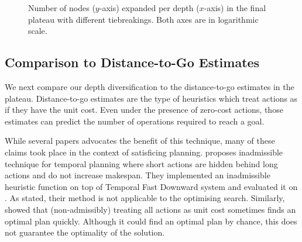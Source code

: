 \begin{figure}[tb]
 \caption{Number of nodes ($y$-axis) expanded per depth ($x$-axis) in
 the final plateau with different tiebreakings. Both axes are in logarithmic scale.
 }
 \label{fig:depth-histogram}
\end{figure}




\subsection{Comparison to Distance-to-Go Estimates}

We next compare our depth diversification to the distance-to-go
estimates in the plateau.  Distance-to-go estimates are the type of
heuristics which treat actions as if they have the unit cost. Even under
the presence of zero-cost actions, those estimates can predict the
number of operations required to reach a goal.

While several papers advocates the benefit of this technique, many of
these claims took place in the context of satisficing planning.
\cite{benton2010g} proposes inadmissible technique for temporal planning
where short actions are hidden behind long actions and do not increase makespan.
They implemented an inadmissible heuristic function on top of Temporal Fast
Downward system and evaluated it on \astar.
As stated, their method is not applicable to the optimising search.
Similarly, \cite{cushing2010cost,wilt2011cost} showed that (non-admissibly) treating all
actions as unit cost sometimes finds an optimal plan quickly. Although
it could find an optimal plan by chance, this does not guarantee the
optimality of the solution.

